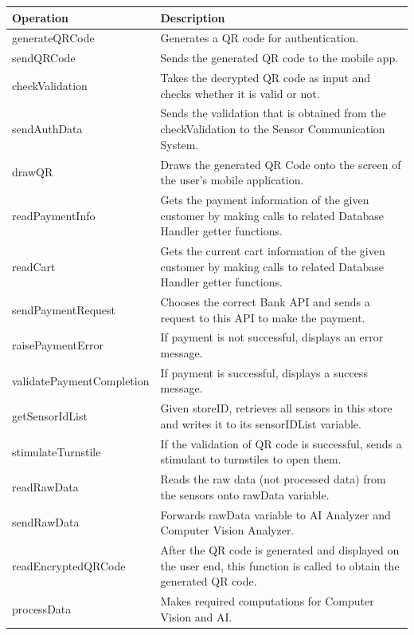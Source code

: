 \documentclass[11pt]{article}
\begin{document}
    \begin{longtable}[H]{|p{5cm}|p{11cm}|}
        \hline
        \textbf{Operation} & \textbf{Description} \\ \hline
        generateQRCode & Generates a QR code for authentication. \\ \hline
        sendQRCode & Sends the generated QR code to the mobile app. \\ \hline
        checkValidation & Takes the decrypted QR code as input and checks whether it is valid or not. \\ \hline
        sendAuthData & Sends the validation that is obtained from the checkValidation to the Sensor Communication System. \\ \hline
        drawQR & Draws the generated QR Code onto the screen of the user's mobile application.\\ \hline
        readPaymentInfo & Gets the payment information of the given customer by making calls to related Database Handler getter functions.\\ \hline
        readCart & Gets the current cart information of the given customer by making calls to related Database Handler getter functions.\\ \hline
        sendPaymentRequest & Chooses the correct Bank API and sends a request to this API to make the payment.\\ \hline
        raisePaymentError & If payment is not successful, displays an error message. \\ \hline
        validatePaymentCompletion & If payment is successful, displays a success message.\\ \hline
        getSensorIdList & Given storeID, retrieves all sensors in this store and writes it to its sensorIDList variable.\\ \hline
        stimulateTurnstile & If the validation of QR code is successful, sends a stimulant to turnstiles to open them.\\ \hline
        readRawData & Reads the raw data (not processed data) from the sensors onto rawData variable. \\ \hline
        sendRawData & Forwards rawData variable to AI Analyzer and Computer Vision Analyzer.\\ \hline
        readEncryptedQRCode & After the QR code is generated and displayed on the user end, this function is called to obtain the generated QR code.\\ \hline
        processData & Makes required computations for Computer Vision and AI.\\ \hline       

\end{longtable}
\end{document}
